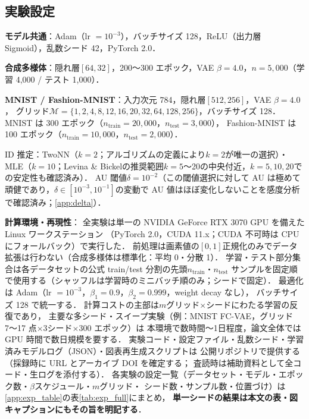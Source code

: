 \documentclass[11pt,a4paper]{jsarticle}
\begin{document}
\subsection{実験設定}\label{sec:exp_setup}

\textbf{モデル共通}：Adam（lr $= 10^{-3}$），バッチサイズ 128，ReLU（出力層 Sigmoid），乱数シード 42，PyTorch 2.0．

\textbf{合成多様体}：隠れ層$[64, 32]$，200〜300 エポック，VAE $\beta = 4.0$，$n = 5{,}000$（学習 4,000 / テスト 1,000）．

\textbf{MNIST / Fashion-MNIST}：入力次元 784，隠れ層$[512, 256]$，VAE $\beta = 4.0$，
グリッド$\mathcal{M} = \{1,2,4,8,12,16,20,32,64,128,256\}$，バッチサイズ 128．
MNIST は 300 エポック（$n_{\mathrm{train}} = 20{,}000$，$n_{\mathrm{test}} = 3{,}000$），
Fashion-MNIST は 100 エポック（$n_{\mathrm{train}} = 10{,}000$，$n_{\mathrm{test}} = 2{,}000$）．

ID 推定：TwoNN（$k=2$；アルゴリズムの定義により$k=2$が唯一の選択）・MLE（$k=10$；Levina \& Bickel\cite{levina2005mle}の推奨範囲$k=5$〜20の中央付近，$k=5,10,20$での安定性も確認済み）\cite{facco2017twonn,levina2005mle}．
AU 閾値$\delta = 10^{-2}$\cite{lucas2019elbo}（この閾値選択に対して AU は極めて頑健であり，$\delta \in [10^{-3}, 10^{-1}]$の変動で AU 値はほぼ変化しないことを感度分析で確認済み；\ref{app:delta}）．

\textbf{計算環境・再現性}：
全実験は単一の NVIDIA GeForce RTX 3070 GPU を備えた Linux ワークステーション
（PyTorch 2.0，CUDA 11.x；CUDA 不可時は CPU にフォールバック）で実行した．
前処理は画素値の$[0,1]$正規化のみでデータ拡張は行わない（合成多様体は標準化：平均 0・分散 1）．
学習・テスト部分集合は各データセットの公式 train/test 分割の先頭$n_\mathrm{train}$・$n_\mathrm{test}$
サンプルを固定順で使用する（シャッフルは学習時のミニバッチ順のみ；シードで固定）．
最適化は Adam（lr $=10^{-3}$，$\beta_1=0.9$，$\beta_2=0.999$，weight decay なし），
バッチサイズ 128 で統一する．
計算コストの主部は$m$グリッド$\times$シードにわたる学習の反復であり，
主要な多シード・スイープ実験（例：MNIST FC-VAE，グリッド 7〜17 点$\times$3シード$\times$300 エポック）は
本環境で数時間〜1日程度，論文全体では GPU 時間で数日規模を要する．
実験コード・設定ファイル・乱数シード・学習済みモデルログ（JSON）・図表再生成スクリプトは
公開リポジトリで提供する（採録時に URL とアーカイブ DOI を確定する；
査読時は補助資料として全コード・生ログを添付する）．
各実験の設定一覧（データセット・モデル・エポック数・$\beta$スケジュール・$m$グリッド・
シード数・サンプル数・位置づけ）は\ref{app:exp_table}の表\ref{tab:exp_full}にまとめ，
\textbf{単一シードの結果は本文の表・図キャプションにもその旨を明記する}．
\end{document}
